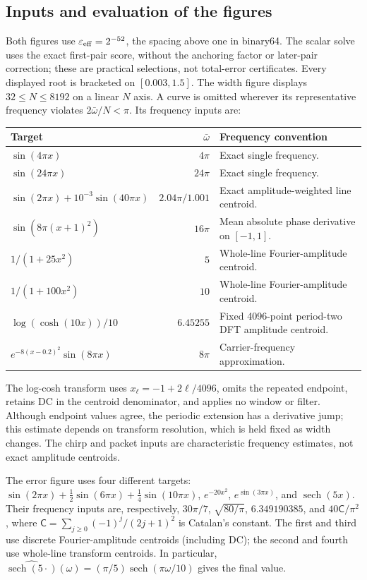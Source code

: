 \documentclass[11pt]{article}
\begin{document}
\subsection{Inputs and evaluation of the figures}
Both figures use $\varepsilon_{\rm eff}=2^{-52}$, the spacing above one in
binary64. The scalar solve uses the exact first-pair score, without the
anchoring factor or later-pair correction; these are practical selections,
not total-error certificates. Every displayed root is bracketed on
$[0.003,1.5]$. The width figure displays $32\le N\le8192$ on a linear
$N$ axis. A curve is omitted wherever its representative frequency
violates $2\bar\omega/N<\pi$. Its frequency inputs are:
\begin{center}
\small
\begin{tabularx}{\linewidth}{l r X}
\toprule
Target & $\bar\omega$ & Frequency convention\\
\midrule
$\sin(4\pi x)$ & $4\pi$ & Exact single frequency.\\
$\sin(24\pi x)$ & $24\pi$ & Exact single frequency.\\
$\sin(2\pi x)+10^{-3}\sin(40\pi x)$
 & $2.04\pi/1.001$ & Exact amplitude-weighted line centroid.\\
$\sin(8\pi(x+1)^2)$ & $16\pi$ & Mean absolute phase derivative on $[-1,1]$.\\
$1/(1+25x^2)$ & $5$ & Whole-line Fourier-amplitude centroid.\\
$1/(1+100x^2)$ & $10$ & Whole-line Fourier-amplitude centroid.\\
$\log(\cosh(10x))/10$ & $6.45255$ & Fixed 4096-point period-two DFT amplitude centroid.\\
$e^{-8(x-0.2)^2}\sin(8\pi x)$ & $8\pi$ & Carrier-frequency approximation.\\
\bottomrule
\end{tabularx}
\end{center}
The log-cosh transform uses $x_\ell=-1+2\ell/4096$, omits the repeated
endpoint, retains DC in the centroid denominator, and applies no window or
filter. Although endpoint values agree, the periodic extension has a
derivative jump; this estimate depends on transform resolution, which is
held fixed as width changes. The chirp and packet inputs are characteristic
frequency estimates, not exact amplitude centroids.

The error figure uses four different targets:
$\sin(2\pi x)+\tfrac12\sin(6\pi x)+\tfrac14\sin(10\pi x)$,
$e^{-20x^2}$, $e^{\sin(3\pi x)}$, and $\operatorname{sech}(5x)$.
Their frequency inputs are, respectively,
$30\pi/7$, $\sqrt{80/\pi}$, $6.349190385$, and
$40\mathsf C/\pi^2$, where $\mathsf C=\sum_{j\ge0}(-1)^j/(2j+1)^2$
is Catalan's constant. The first and third use discrete Fourier-amplitude
centroids (including DC); the second and fourth use whole-line transform
centroids. In particular,
$\widehat{\operatorname{sech}(5\cdot)}(\omega)
=(\pi/5)\operatorname{sech}(\pi\omega/10)$ gives the final value.
\end{document}
